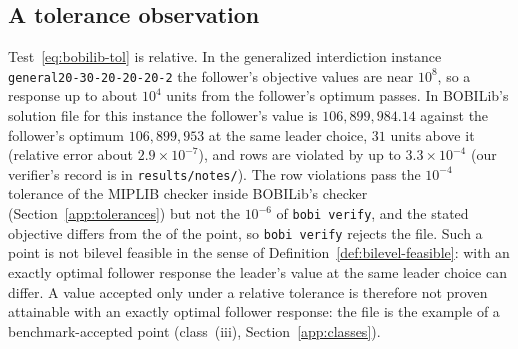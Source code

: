 \subsection{A tolerance observation}

\begin{remark}\label{rem:tolerance}
Test~\eqref{eq:bobilib-tol} is relative. In the generalized interdiction
instance \texttt{general20-30-20-20-20-2} the follower's objective values are
near $10^8$, so a response up to about $10^4$ units from the follower's optimum
passes. In BOBILib's solution file for this instance the follower's value is
$106{,}899{,}984.14$ against the follower's optimum $106{,}899{,}953$ at the same
leader choice, $31$ units above it (relative error about $2.9\times10^{-7}$), and
rows are violated by up to $3.3\times10^{-4}$ (our verifier's record is in
\texttt{results/notes/}). The row violations pass the $10^{-4}$ tolerance of
the MIPLIB checker inside BOBILib's checker (Section~\ref{app:tolerances}) but
not the $10^{-6}$ of \texttt{bobi verify}, and the stated objective
\GenTolObjFile{} differs from the \GenTolObjComputed{} of the point, so
\texttt{bobi verify} rejects the file. Such a point is
not bilevel feasible in the sense of Definition~\ref{def:bilevel-feasible}:
with an exactly optimal follower response the leader's value at the same
leader choice can differ. A value accepted only under a relative tolerance
is therefore not proven attainable with an exactly optimal follower
response: the file is the example of a benchmark-accepted point
(class~(iii), Section~\ref{app:classes}).
\end{remark}

